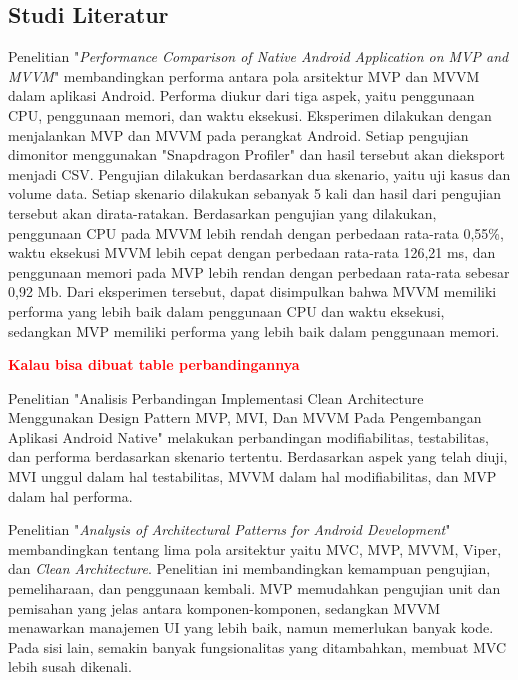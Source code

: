 \documentclass[conference]{IEEEtran}
\begin{document}
	\subsection{Studi Literatur}
	Penelitian "\textit{Performance Comparison of Native Android Application on MVP and MVVM}" \cite{Wis2020} membandingkan performa antara pola arsitektur MVP dan MVVM dalam aplikasi Android. Performa diukur dari tiga aspek, yaitu penggunaan CPU, penggunaan memori, dan waktu eksekusi. Eksperimen dilakukan dengan menjalankan MVP dan MVVM pada perangkat Android. Setiap pengujian dimonitor menggunakan "Snapdragon Profiler" dan hasil tersebut akan dieksport menjadi CSV. Pengujian dilakukan berdasarkan dua skenario, yaitu uji kasus dan volume data. Setiap skenario dilakukan sebanyak 5 kali dan hasil dari pengujian tersebut akan dirata-ratakan. Berdasarkan pengujian yang dilakukan, penggunaan CPU pada MVVM lebih rendah dengan perbedaan rata-rata 0,55\%, waktu eksekusi MVVM lebih cepat dengan perbedaan rata-rata 126,21 ms, dan penggunaan memori pada MVP lebih rendan dengan perbedaan rata-rata sebesar 0,92 Mb. Dari eksperimen tersebut, dapat disimpulkan bahwa MVVM memiliki performa yang lebih baik dalam penggunaan CPU dan waktu eksekusi, sedangkan MVP memiliki performa yang lebih baik dalam penggunaan memori.
	
	\textbf{\textcolor{red}{Kalau bisa dibuat table perbandingannya}}
	
	Penelitian "Analisis Perbandingan Implementasi Clean Architecture Menggunakan Design Pattern MVP, MVI, Dan MVVM Pada Pengembangan Aplikasi Android Native" \cite{Fir2024} melakukan perbandingan modifiabilitas, testabilitas, dan performa berdasarkan skenario tertentu. Berdasarkan aspek yang telah diuji, MVI unggul dalam hal testabilitas, MVVM dalam hal modifiabilitas, dan MVP dalam hal performa.
	
	Penelitian "\textit{Analysis of Architectural Patterns for Android Development}" \cite{Akh2021} membandingkan tentang lima pola arsitektur yaitu MVC, MVP, MVVM, Viper, dan \textit{Clean Architecture}. Penelitian ini membandingkan kemampuan pengujian, pemeliharaan, dan penggunaan kembali. MVP memudahkan pengujian unit dan pemisahan yang jelas antara komponen-komponen, sedangkan MVVM menawarkan manajemen UI yang lebih baik, namun memerlukan banyak kode. Pada sisi lain, semakin banyak fungsionalitas yang ditambahkan, membuat MVC lebih susah dikenali.
	
\end{document}
